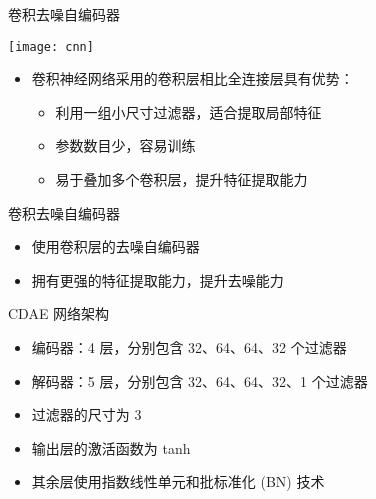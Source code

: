 \documentclass{beamer}
\begin{document}
\begin{frame}[t]
  \begin{alertblock}{卷积去噪自编码器}
  \end{alertblock}
  \begin{center}
    \texttt{[image: cnn]}
  \end{center}
  \vspace{-1ex}
  \begin{itemize}
    \item 卷积神经网络采用的\alert{卷积层}相比\alert{全连接层}具有优势：
      \begin{itemize}
        \item 利用一组小尺寸过滤器，适合提取局部特征
        \item 参数数目少，容易训练
        \item 易于叠加多个卷积层，提升特征提取能力
      \end{itemize}
  \end{itemize}
  \begin{alertblock}{卷积去噪自编码器}
    \vspace{-1ex}
    \begin{itemize}
      \item 使用卷积层的去噪自编码器
      \item 拥有更强的特征提取能力，提升去噪能力
    \end{itemize}
  \end{alertblock}
\end{frame}

\begin{frame}[t]
  \begin{alertblock}{CDAE 网络架构}
  \end{alertblock}
  \begin{itemize}
    \item 编码器：4 层，分别包含 32、64、64、32 个过滤器
    \item 解码器：5 层，分别包含 32、64、64、32、1 个过滤器
    \item 过滤器的尺寸为 3
    \item 输出层的激活函数为 \alert{tanh}
    \item 其余层使用\alert{指数线性单元}和\alert{批标准化} (BN) 技术
  \end{itemize}
\end{frame}
\end{document}
